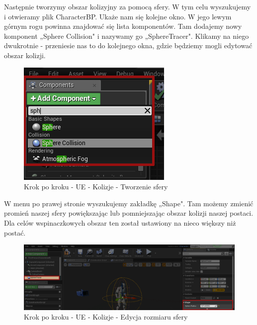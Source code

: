 \documentclass[12pt]{xmgr}
\begin{document}
\newpage
Następnie tworzymy obszar kolizyjny za pomocą sfery. W tym celu wyszukujemy i otwieramy plik CharacterBP. Ukaże nam się kolejne okno. W jego lewym górnym rogu powinna znajdować się lista komponentów. Tam dodajemy nowy komponent „Sphere Collision" i nazywamy go „SphereTracer". Klikamy na niego dwukrotnie - przeniesie nas to do kolejnego okna, gdzie będziemy mogli edytować obszar kolizji.

\begin{figure}[!htb]
    \begin{center}
    \includegraphics[scale=0.5]{Screeny/UeKrokPoKroku/UE-Climb-Sphere01.png}
    \end{center}
    \caption{Krok po kroku - UE - Kolizje - Tworzenie sfery}
\end{figure}
\newpage

W menu po prawej stronie wyszukujemy zakładkę „Shape". Tam możemy zmienić promień naszej sfery powiększając lub pomniejszając obszar kolizji naszej postaci. Dla celów wspinaczkowych obszar ten został ustawiony na nieco większy niż postać.

\begin{figure}[!htb]
    \begin{center}
    \includegraphics[scale=0.35]{Screeny/UeKrokPoKroku/UE-Climb-Sphere02.png}
    \end{center}
    \caption{Krok po kroku - UE - Kolizje - Edycja rozmiaru sfery}
\end{figure}
\end{document}
